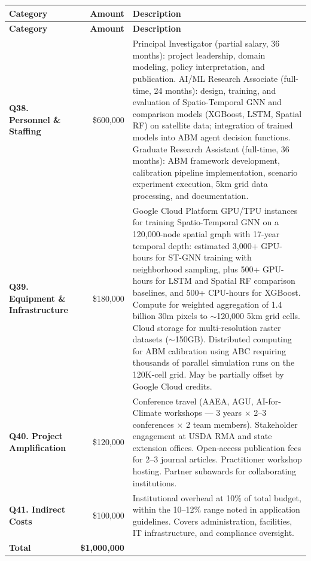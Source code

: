 \documentclass[11pt,letterpaper]{article}
\begin{document}
\begin{longtable}{p{4cm} r p{8cm}}
\toprule
\textbf{Category} & \textbf{Amount} & \textbf{Description} \\
\midrule
\endfirsthead
\toprule
\textbf{Category} & \textbf{Amount} & \textbf{Description} \\
\midrule
\endhead

\textbf{Q38. Personnel \& Staffing} & \$600,000 &
Principal Investigator (partial salary, 36 months): project leadership, domain modeling, policy interpretation, and publication. AI/ML Research Associate (full-time, 24 months): design, training, and evaluation of Spatio-Temporal GNN and comparison models (XGBoost, LSTM, Spatial RF) on satellite data; integration of trained models into ABM agent decision functions. Graduate Research Assistant (full-time, 36 months): ABM framework development, calibration pipeline implementation, scenario experiment execution, 5km grid data processing, and documentation. \\
\midrule

\textbf{Q39. Equipment \& Infrastructure} & \$180,000 &
Google Cloud Platform GPU/TPU instances for training Spatio-Temporal GNN on a 120,000-node spatial graph with 17-year temporal depth: estimated 3,000+ GPU-hours for ST-GNN training with neighborhood sampling, plus 500+ GPU-hours for LSTM and Spatial RF comparison baselines, and 500+ CPU-hours for XGBoost. Compute for weighted aggregation of 1.4 billion 30m pixels to ${\sim}$120,000 5km grid cells. Cloud storage for multi-resolution raster datasets (${\sim}$150GB). Distributed computing for ABM calibration using ABC requiring thousands of parallel simulation runs on the 120K-cell grid. May be partially offset by Google Cloud credits. \\
\midrule

\textbf{Q40. Project Amplification} & \$120,000 &
Conference travel (AAEA, AGU, AI-for-Climate workshops --- 3 years $\times$ 2--3 conferences $\times$ 2 team members). Stakeholder engagement at USDA RMA and state extension offices. Open-access publication fees for 2--3 journal articles. Practitioner workshop hosting. Partner subawards for collaborating institutions. \\
\midrule

\textbf{Q41. Indirect Costs} & \$100,000 &
Institutional overhead at 10\% of total budget, within the 10--12\% range noted in application guidelines. Covers administration, facilities, IT infrastructure, and compliance oversight. \\
\midrule
\textbf{Total} & \textbf{\$1,000,000} & \\
\bottomrule
\end{longtable}
\end{document}
